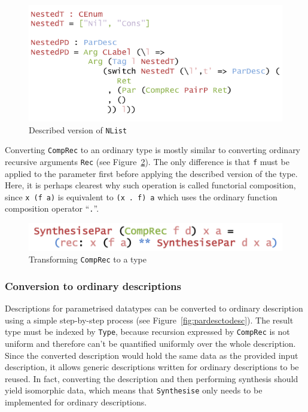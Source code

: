 \documentclass{ituthesis}
\newcommand{\ttconstructor}[1]{\textcolor{constructor-color}{\texttt{#1}}}
\newcommand{\tttype}[1]{\textcolor{type-color}{\texttt{#1}}}
\newcommand{\ttdec}[1]{\textcolor{declared-var-color}{\texttt{#1}}}
\newcommand{\ttvar}[1]{\textcolor{local-var-color}{\texttt{#1}}}
\theoremstyle{break}
\begin{document}
\begin{figure}[ht]
\begin{center}
    \includegraphics[scale=0.5]{Figures/NestedListDescription}
\end{center}
\caption{Described version of \tttype{NList}}
\label{fig:nlistdesc}
\end{figure}

Converting \ttconstructor{CompRec} to an ordinary type is mostly similar to converting ordinary recursive arguments \ttconstructor{Rec} (see Figure~\ref{fig:parsynthex}).
The only difference is that \ttvar{f} must be applied to the parameter first before applying the described version of the type.
Here, it is perhaps clearest why such operation is called functorial composition, since \ttvar{x}~\texttt{(}\ttvar{f}~\ttvar{a}\texttt{)} is equivalent to \texttt{(}\ttvar{x}~\texttt{.}~\ttvar{f}\texttt{)}~\ttvar{a} which uses
the ordinary function composition operator ``\texttt{.}''.

\begin{figure}[ht]
\begin{center}
    \includegraphics[scale=0.5]{Figures/ParSynthesisingExtended.png}
\end{center}
\caption{Transforming \ttconstructor{CompRec} to a type}
\label{fig:parsynthex}
\end{figure}


\subsubsection{Conversion to ordinary descriptions}
\label{ssub:Conversion to ordinary descriptions}

Descriptions for parametrised datatypes can be converted to ordinary description using a simple step-by-step process (see Figure~\ref{fig:pardesctodesc}).
The result type must be indexed by \tttype{Type}, because recursion expressed by \ttconstructor{CompRec} is not uniform and therefore can't be quantified uniformly over the whole description.
Since the converted description would hold the same data as the provided input description, it allows generic descriptions written for ordinary descriptions to be reused.
In fact, converting the description and then performing synthesis should yield isomorphic data, which means that \ttdec{Synthesise} only needs to be implemented for ordinary descriptions.
\end{document}
